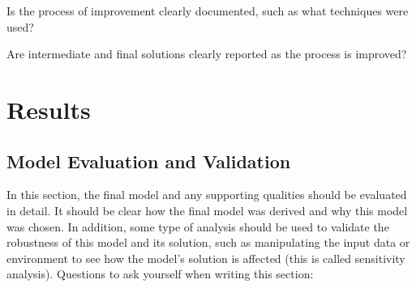 \documentclass[12pt,journal,compsoc]{IEEEtran}
\begin{document}
Is the process of improvement clearly documented, such as what techniques were used?

Are intermediate and final solutions clearly reported as the process is improved?










\section{Results} %
\subsection{Model Evaluation and Validation}
In this section, the final model and any supporting qualities should be evaluated in detail. It should be clear how the final model was derived and why this model was chosen. In addition, some type of analysis should be used to validate the robustness of this model and its solution, such as manipulating the input data or environment to see how the model’s solution is affected (this is called sensitivity analysis). Questions to ask yourself when writing this section:
\end{document}
